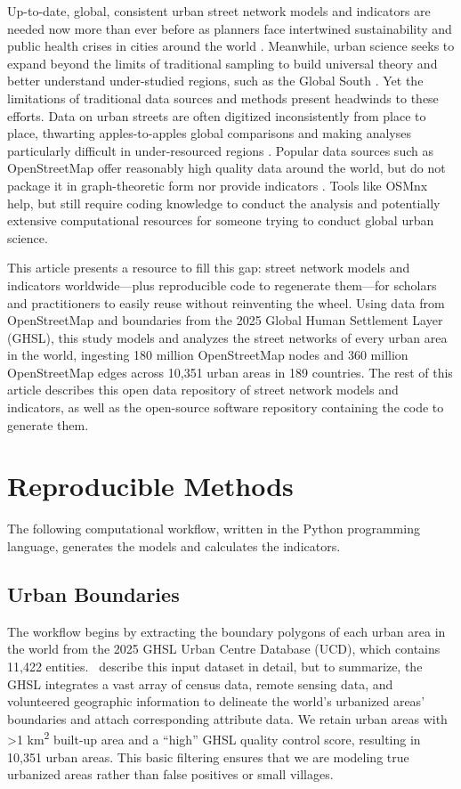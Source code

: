 \documentclass[12pt,letterpaper]{article} %
\begin{document}
Up-to-date, global, consistent urban street network models and indicators are needed now more than ever before as planners face intertwined sustainability and public health crises in cities around the world \citep{giles-corti_creating_2022}. Meanwhile, urban science seeks to expand beyond the limits of traditional sampling to build universal theory and better understand under-studied regions, such as the Global South \citep{lobo_urban_2020}. Yet the limitations of traditional data sources and methods present headwinds to these efforts. Data on urban streets are often digitized inconsistently from place to place, thwarting apples-to-apples global comparisons and making analyses particularly difficult in under-resourced regions \citep{liu_generalized_2022}. Popular data sources such as OpenStreetMap offer reasonably high quality data around the world, but do not package it in graph-theoretic form nor provide indicators \citep{boeing_modeling_2025}. Tools like OSMnx help, but still require coding knowledge to conduct the analysis and potentially extensive computational resources for someone trying to conduct global urban science.

This article presents a resource to fill this gap: street network models and indicators worldwide---plus reproducible code to regenerate them---for scholars and practitioners to easily reuse without reinventing the wheel. Using data from OpenStreetMap and boundaries from the 2025 Global Human Settlement Layer (GHSL), this study models and analyzes the street networks of every urban area in the world, ingesting 180 million OpenStreetMap nodes and 360 million OpenStreetMap edges across 10,351 urban areas in 189 countries. The rest of this article describes this open data repository of street network models and indicators, as well as the open-source software repository containing the code to generate them.

\section{Reproducible Methods}

The following computational workflow, written in the Python programming language, generates the models and calculates the indicators.

\subsection{Urban Boundaries}

The workflow begins by extracting the boundary polygons of each urban area in the world from the 2025 GHSL Urban Centre Database (UCD), which contains 11,422 entities.\ \citet{mari_rivero_urban_2025} describe this input dataset in detail, but to summarize, the GHSL integrates a vast array of census data, remote sensing data, and volunteered geographic information to delineate the world's urbanized areas' boundaries and attach corresponding attribute data. We retain urban areas with >1 km\textsuperscript{2} built-up area and a \enquote{high} GHSL quality control score, resulting in 10,351 urban areas. This basic filtering ensures that we are modeling true urbanized areas rather than false positives or small villages.
\end{document}
